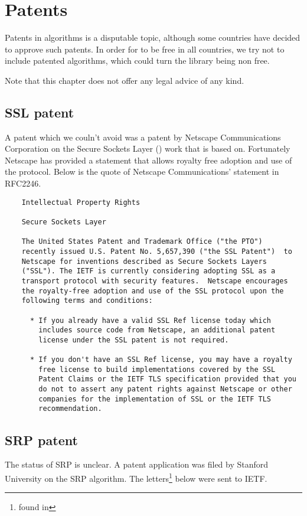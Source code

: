\chapter{Patents}
\label{ap:patents}
Patents in algorithms is a disputable topic, although some countries have 
decided to approve such patents. In order for \gnutls{} to be free in all
countries, we try not to include patented algorithms, which could turn the 
library being non free.

\par 
Note that this chapter does not offer any legal advice of any kind.

\section{SSL patent}
A patent which we couln't avoid was a patent by Netscape Communications 
Corporation on the Secure Sockets Layer (\ssl{}) work that \tlsI{} is based on.
Fortunately Netscape has provided a statement that allows royalty free 
adoption and use of the \ssl{} protocol. Below is the quote of Netscape 
Communications' statement in RFC2246\cite{RFC2246}.

\begin{verbatim}
    Intellectual Property Rights

    Secure Sockets Layer

    The United States Patent and Trademark Office ("the PTO")
    recently issued U.S. Patent No. 5,657,390 ("the SSL Patent")  to
    Netscape for inventions described as Secure Sockets Layers
    ("SSL"). The IETF is currently considering adopting SSL as a
    transport protocol with security features.  Netscape encourages
    the royalty-free adoption and use of the SSL protocol upon the
    following terms and conditions:

      * If you already have a valid SSL Ref license today which
        includes source code from Netscape, an additional patent
        license under the SSL patent is not required.

      * If you don't have an SSL Ref license, you may have a royalty
        free license to build implementations covered by the SSL
        Patent Claims or the IETF TLS specification provided that you
        do not to assert any patent rights against Netscape or other
        companies for the implementation of SSL or the IETF TLS
        recommendation.
\end{verbatim}

\section{SRP patent}
\label{ap:srppatent}
The status of SRP is unclear.
A patent application was filed by Stanford University on the SRP algorithm.
The letters\footnote{found in } below were sent to IETF.

